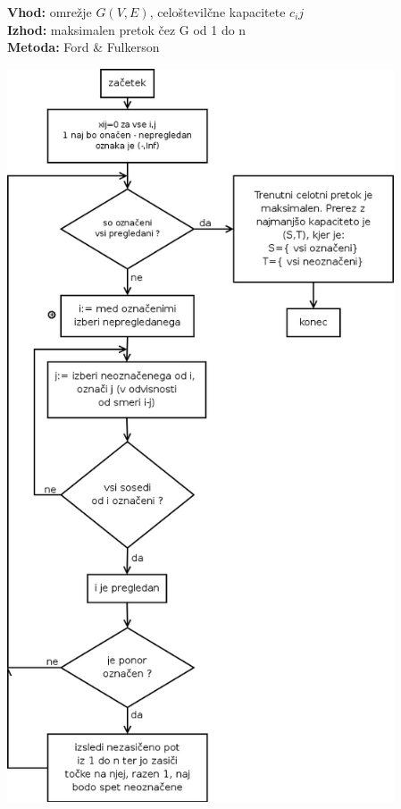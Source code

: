 \documentclass[a4paper,10pt]{article}
\begin{document}
\textbf{Vhod:} omre\v zje $G(V,E)$, celo\v stevil\v cne kapacitete $c_ij$\\
\textbf{Izhod:} maksimalen pretok \v cez G od 1 do n\\
\textbf{Metoda:} Ford \& Fulkerson\\
	\begin{center}
	\includegraphics[width=11.45cm,height=21.7cm]{Slike/MaxPretokDiagram.png}
	\end{center}
\end{document}
